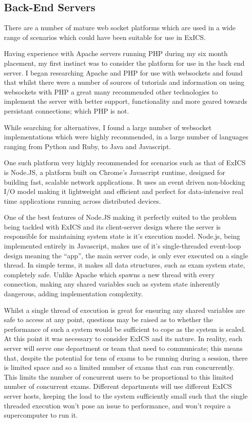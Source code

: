 \subsection{Back-End Servers}

There are a number of mature web socket platforms which are used in a wide range of scenarios which could have been suitable for use in ExICS.

Having experience with Apache servers running PHP during my six month placement, my first instinct was to consider the platform for use in the back end server.  I began researching Apache and PHP for use with websockets and found that whilst there were a number of sources of tutorials and information on using websockets with PHP a great many recommended other technologies to implement the server with better support, functionality and more geared towards persistant connections; which PHP is not.

While searching for alternatives, I found a large number of websocket implementations which were highly recommended, in a large number of languages ranging from Python and Ruby, to Java and Javascript.

One such platform very highly recommended for scenarios such as that of ExICS \cite{whyNodeJS} is Node.JS, a platform built on Chrome's Javascript runtime, designed for building fast, scalable network applications.  It uses an event driven non-blocking I/O model making it lightweight and efficient and perfect for data-intensive real time applications running across distributed devices.\cite{nodeJS}

One of the best features of Node.JS making it perfectly suited to the problem being tackled with ExICS and its client-server design where the server is responsible for maintaining system state is it's execution model.  Node.js, being implemented entirely in Javascript, makes use of it's single-threaded event-loop design meaning the ``app'', the main server code, is only ever executed on a single thread.\cite{understandingNodeEventLoop}  In simple terms, it makes all data structures, such as exam system state, completely safe.  Unlike Apache which spawns a new thread with every connection, making any shared variables such as system state inherently dangerous, adding implementation complexity.

Whilst a single thread of execution is great for ensuring any shared variables are safe to access at any point, questions may be raised as to whether the performance of such a system would be sufficient to cope as the system is scaled.  At this point it was necessary to consider ExICS and its nature.  In reality, each server will serve one department or team that need to communicate; this means that, despite the potential for tens of exams to be running during a session, there is limited space and so a limited number of exams that can run concurrently.  This limits the number of concurrent users to be proportional to this limited number of concurrent exams.  Different departments will use different ExICS server hosts, keeping the load to the system sufficiently small such that the single threaded execution won't pose an issue to performance, and won't require a supercomputer to run it.

